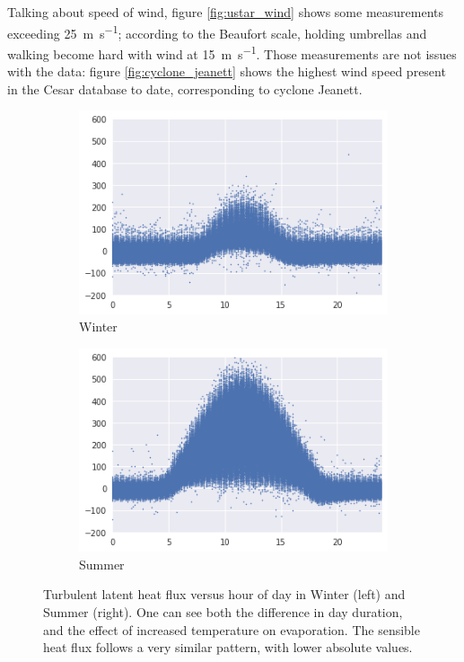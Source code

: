 \documentclass[12pt]{book}
\begin{document}
Talking about speed of wind, figure \ref{fig:ustar_wind} shows some measurements exceeding \SI{25}{\meter\per\second}; according to the Beaufort scale, holding umbrellas and walking become hard with wind at \SI{15}{\meter\per\second}. Those measurements are not issues with the data: figure \ref{fig:cyclone_jeanett} shows the highest wind speed present in the Cesar database to date, corresponding to cyclone Jeanett.

\begin{figure}
    \centering
    \begin{subfigure}[t]{0.48\textwidth}
        \centering
        \includegraphics[width=\textwidth]{images/le_winter}
        \caption{Winter}
        \label{fig:le_winter}
    \end{subfigure}
    \hfill
    \begin{subfigure}[t]{0.48\textwidth}
        \centering
        \includegraphics[width=\textwidth]{images/le_summer}
        \caption{Summer}
        \label{fig:le_summer}
    \end{subfigure}
    \caption{Turbulent latent heat flux versus hour of day in Winter (left) and Summer (right). One can see both the difference in day duration, and the effect of increased temperature on evaporation. The sensible heat flux follows a very similar pattern, with lower absolute values.}
	\label{fig:le_season}
\end{figure}
\end{document}
